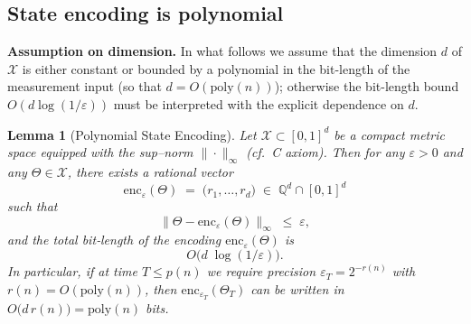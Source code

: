\documentclass[12pt]{article}
\theoremstyle{definition}
\theoremstyle{plain}
\newtheorem{lemma}{Lemma}[section]
\begin{document}
\subsection{State encoding is polynomial}
\noindent\textbf{Assumption on dimension.} In what follows we assume that the dimension \(d\) of \(\mathcal X\) is either constant or bounded by a polynomial in the bit-length of the measurement input (so that \(d=O(\mathrm{poly}(n))\)); otherwise the bit-length bound \(O(d\log(1/\varepsilon))\) must be interpreted with the explicit dependence on \(d\).

\begin{lemma}[Polynomial State Encoding]
\label{lem:poly-encoding}
Let \(\mathcal X\subset[0,1]^d\) be a compact metric space equipped with the sup–norm \(\|\cdot\|_\infty\) (cf.\ C axiom).  Then for any \(\varepsilon>0\) and any \(\Theta\in\mathcal X\), there exists a rational vector
\[
  \mathrm{enc}_{\varepsilon}(\Theta)\;=\;\bigl(r_1,\dots,r_d\bigr)\;\in\;\mathbb Q^d\cap[0,1]^d
\]
such that
\[
  \bigl\|\Theta - \mathrm{enc}_{\varepsilon}(\Theta)\bigr\|_\infty \;\le\;\varepsilon,
\]
and the total bit‑length of the encoding \(\mathrm{enc}_{\varepsilon}(\Theta)\) is
\[
  O\!\bigl(d\;\log(1/\varepsilon)\bigr).
\]
In particular, if at time \(T\le p(n)\) we require precision
\(\varepsilon_T = 2^{-r(n)}\) with \(r(n)=O(\mathrm{poly}(n))\), then
\(\mathrm{enc}_{\varepsilon_T}(\Theta_T)\) can be written in
\(O\bigl(d\,r(n)\bigr)=\mathrm{poly}(n)\) bits.
\end{lemma}
\end{document}
